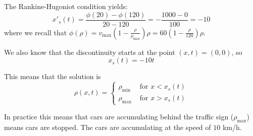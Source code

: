 \begin{solution}
\begin{slide}

\begin{parts}

\item The Rankine-Hugoniot condition yields:
\[
x'_s(t) = \frac{\phi(20) - \phi(120)}{20-120} = -\frac{1000 - 0}{100} = -10
\]
where we recall that $\displaystyle\phi(\rho) = v_{\max} \left( 1 - \frac{\rho}{\rho_{\max}}\right) \rho = 60 \left(1 - \frac{\rho}{120}\right) \rho$.

We also know that the discontinuity starts at the point $(x,t) = (0,0)$, so 
\[
x_s(t) = -10t
\]

\begin{minipage}{.5\textwidth}
This means that the solution is
\[
\rho(x,t) = 
	\begin{cases}
		\rho_{\min} & \text{ for } x < x_s(t) \\
		\rho_{\max} & \text{ for } x > x_s(t)
	\end{cases}
\]

In practice this means that cars are accumulating behind the traffic sign ($\rho_{\max}$) means cars are stopped.
The cars are accumulating at the speed of $10$ km/h.
\end{minipage}
\hfill
\begin{minipage}{.4\textwidth}
\end{minipage}

\end{parts}
	
\end{slide}	
\end{solution}


